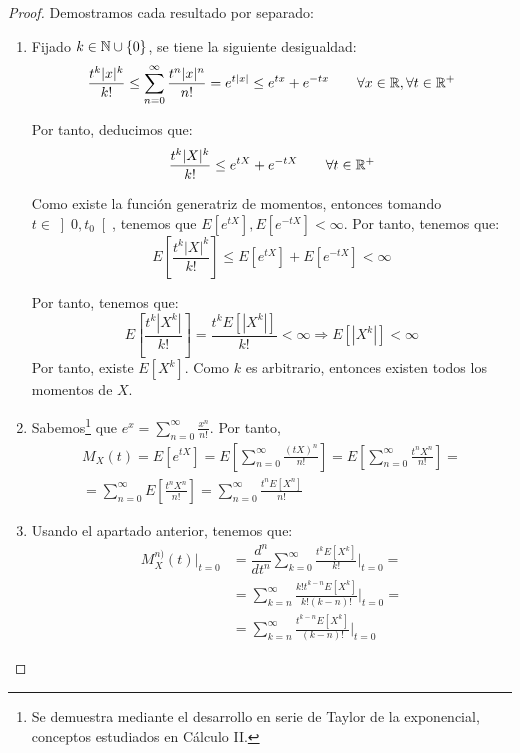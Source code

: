 \begin{proof}
    Demostramos cada resultado por separado:
    \begin{enumerate}
        \item Fijado $k\in \mathbb{N}\cup \{0\}$, se tiene la siguiente desigualdad:
        \begin{equation*}
            \dfrac{t^k|x|^k}{k!}
            \leq \sum_{n=0}^\infty \dfrac{t^n|x|^n}{n!}
            = e^{t|x|}\leq e^{tx} + e^{-tx}
            \qquad \forall x\in \mathbb{R}, \forall t\in \mathbb{R}^+
        \end{equation*}

        Por tanto, deducimos que:
        \begin{equation*}
            \dfrac{t^k |X|^k}{k!}\leq e^{tX} + e^{-tX}\qquad \forall t\in \mathbb{R}^+
        \end{equation*}

        Como existe la función generatriz de momentos, entonces tomando $t\in \left]0,t_0\right[$, tenemos que $E[e^{tX}], E[e^{-tX}]<\infty$. Por tanto, tenemos que:
        \begin{equation*}
            E\left[\dfrac{t^k |X|^k}{k!}\right] \leq E[e^{tX}] + E[e^{-tX}] < \infty
        \end{equation*}

        Por tanto, tenemos que:
        \begin{equation*}
            E\left[\dfrac{t^k |X^k|}{k!}\right] = \dfrac{t^k E[|X^k|]}{k!} < \infty
            \Longrightarrow
            E[|X^k|] < \infty
        \end{equation*}
        Por tanto, existe $E[X^k]$. Como $k$ es arbitrario, entonces existen todos los momentos de $X$.
        \item Sabemos\footnote{Se demuestra mediante el desarrollo en serie de Taylor de la exponencial, conceptos estudiados en Cálculo II.} que $e^x = \sum\limits_{n=0}^\infty \frac{x^n}{n!}$. Por tanto,
        \begin{multline*}
            M_X(t)=E[e^{tX}]
            = E\left[\sum_{n=0}^\infty \frac{(tX)^n}{n!}\right]
            = E\left[\sum_{n=0}^\infty \frac{t^n X^n}{n!}\right]
            =\\= \sum_{n=0}^\infty E\left[ \frac{t^n X^n}{n!}\right]
            = \sum_{n=0}^\infty \frac{t^n E\left[X^n\right]}{n!}
        \end{multline*}

        \item Usando el apartado anterior, tenemos que:
        \begin{align*}
            M_X^{n)}(t)\Big|_{t=0}
            &= \dfrac{d^n}{dt^n}\sum_{k=0}^\infty \frac{t^k E\left[X^k\right]}{k!}\Big|_{t=0}
            =\\&= \sum_{k=n}^\infty \frac{k!t^{k-n} E\left[X^k\right]}{k!(k-n)!}\Big|_{t=0}
            =\\&= \sum_{k=n}^\infty \frac{t^{k-n} E\left[X^k\right]}{(k-n)!}\Big|_{t=0}
        \end{align*}


\end{enumerate}
\end{proof}
